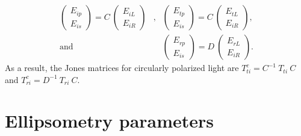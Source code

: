 \begin{eqnarray*}
\begin{pmatrix} E_{ip} \\ E_{is} \end{pmatrix}
= C\  
\begin{pmatrix} E_{iL} \\ E_{iR} \end{pmatrix}
& , &
\begin{pmatrix} E_{tp} \\ E_{is} \end{pmatrix}
= C\  
\begin{pmatrix} E_{tL} \\ E_{iR} \end{pmatrix},\\
\mathrm{and} & &
\begin{pmatrix} E_{rp} \\ E_{is} \end{pmatrix}
= D\  
\begin{pmatrix} E_{rL} \\ E_{iR} \end{pmatrix}.
\end{eqnarray*}
As a result, the Jones matrices for circularly polarized light are
$T^c_{ti} = C^{-1}\ T_{ti}\ C$ and
$T^c_{ri} = D^{-1}\ T_{ri}\ C$.

\section{Ellipsometry parameters}

